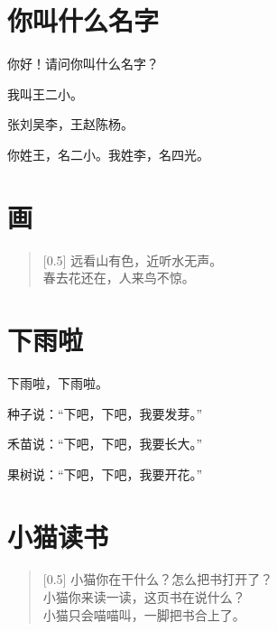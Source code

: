 \documentclass[12pt,UTF-8,openany]{ctexbook}
\begin{document}
\chapter{你叫什么名字}

\begin{large}
    
    你好！请问你叫什么名字？
    
    我叫王二小。
    
    张刘吴李，王赵陈杨。
    
    你姓王，名二小。我姓李，名四光。
    
\end{large}





\chapter{画}

\begin{large}
    
    \begin{verse}[0.5\linewidth]
        远看山有色，近听水无声。 \\
        春去花还在，人来鸟不惊。
    \end{verse}
    
\end{large}





\chapter{下雨啦}

\begin{large}
    
    下雨啦，下雨啦。
    
    种子说：“下吧，下吧，我要发芽。”
    
    禾苗说：“下吧，下吧，我要长大。”
    
    果树说：“下吧，下吧，我要开花。”
    
\end{large}





\chapter{小猫读书}

\begin{large}
    
    \begin{verse}[0.5\linewidth]
        小猫你在干什么？怎么把书打开了？ \\
        小猫你来读一读，这页书在说什么？ \\
        小猫只会喵喵叫，一脚把书合上了。
    \end{verse}
    
\end{large}
\end{document}
